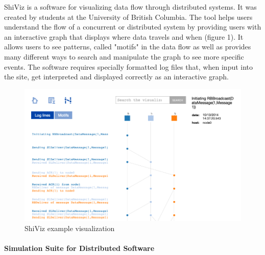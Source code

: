 \documentclass[12pt, oneside]{article}   	%
\begin{document}
ShiViz is a software for visualizing data flow through distributed systems.  It was created by students at the University of British Columbia.  The tool helps users understand the flow of a concurrent or distributed system by providing users with an interactive graph that displays where data travels and when (figure 1)\cite{ShiViz}.  It allows users to see patterns, called "motifs" in the data flow as well as provides many different ways to search and manipulate the graph to see more specific events\cite{ShiViz}.  The software requires specially formatted log files that, when input into the site, get interpreted and displayed correctly as an interactive graph.
\begin{figure}[t!]
\caption{ShiViz example visualization}
\includegraphics[scale=0.4]{ShiViz_Example.png} 
\centering
\end{figure}

\paragraph{Simulation Suite for Distributed Software}
\end{document}
